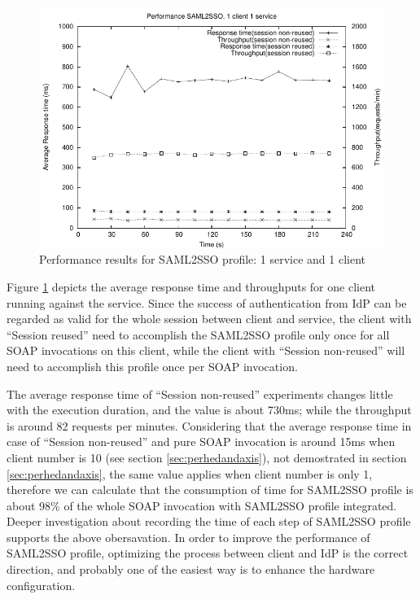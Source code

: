 \documentclass[conference]{IEEEtran}
\begin{document}
\begin{figure}
\includegraphics[width=0.9\columnwidth]{SAML2SSO_thread1.pdf}
\caption{Performance results for SAML2SSO profile: 1 service and 1 client}
\label{fig:SAML2SSO_thread1}
\end{figure}

Figure \ref{fig:SAML2SSO_thread1} depicts the average response time and throughputs for one client 
running against the service. Since the success of authentication from IdP can be regarded as 
valid for the whole session between client and service, the client with ``Session reused'' 
need to accomplish the SAML2SSO profile only once for all SOAP invocations on this client, 
while the client with ``Session non-reused'' will need to accomplish this profile once per 
SOAP invocation.

The average response time of ``Session non-reused'' experiments changes little with the execution 
duration, and the value is about 730ms; while the throughput is around 82 requests per minutes.
Considering that the average response time in case of 
``Session non-reused'' and pure SOAP invocation is around 15ms when client number is 10 (see section
\ref{sec:perhedandaxis}), not demostrated in section \ref{sec:perhedandaxis}, the same value applies 
when client number is only 1, therefore we can calculate that the consumption of time for 
SAML2SSO profile is about 98\% of the whole SOAP invocation with SAML2SSO profile integrated.
Deeper investigation about recording the time of each step of SAML2SSO profile supports the above
obersavation. In order to improve the performance of SAML2SSO profile, optimizing the process between
client and IdP is the correct direction, and probably one of the easiest way is to enhance the 
hardware configuration.
\end{document}
